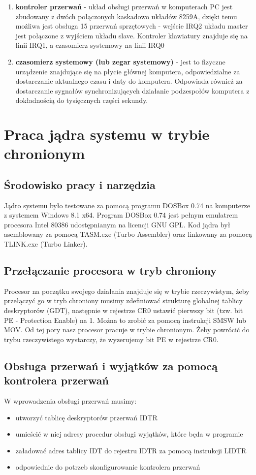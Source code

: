\documentclass[a4paper,12pt]{article}
\begin{document}
\begin{enumerate}
\item{\textbf{kontroler przerwań} - układ obsługi przerwań w komputerach PC jest zbudowany z dwóch połączonych kaskadowo układów 8259A, dzięki temu możliwa jest obsługa 15 przerwań sprzętowych - wejście IRQ2 układu master jest połączone z wyjściem układu slave. Kontroler klawiatury znajduje się na linii IRQ1, a czasomierz systemowy na linii IRQ0}
				\item{\textbf{czasomierz systemowy (lub zegar systemowy)} - jest to fizyczne urządzenie znajdujące się na płycie głównej komputera, odpowiedzialne za dostarczanie aktualnego czasu i daty do komputera. Odpowiada również za dostarczanie sygnałów synchronizujących działanie podzespołów komputera z dokładnością do tysięcznych części sekundy.}
			
\end{enumerate}

	\section{Praca jądra systemu w trybie chronionym}

	\subsection{Środowisko pracy i narzędzia}
	Jądro systemu było testowane za pomocą programu DOSBox 0.74 na komputerze z systemem Windows 8.1 x64. Program DOSBox 0.74 jest pełnym emulatrem procesora Intel 80386 udostępnianym na licencji GNU GPL. Kod jądra był asemblowany za pomocą TASM.exe (Turbo Assembler) oraz linkowany za pomocą TLINK.exe (Turbo Linker). 

	\subsection{Przełączanie procesora w tryb chroniony}
Procesor na początku swojego działania znajduje się w trybie rzeczywistym, żeby przełączyć go w tryb chroniony musimy zdefiniować strukturę globalnej tablicy deskryptorów (GDT), następnie w rejestrze CR0 ustawić pierwszy bit (tzw. bit PE - Protection Enable) na 1. Można to zrobić za pomocą instrukcji SMSW lub MOV. Od tej pory nasz procesor pracuje w trybie chronionym. Żeby powrócić do trybu rzeczywistego wystarczy, że wyzerujemy bit PE w rejestrze CR0.

\subsection{Obsługa przerwań i wyjątków za pomocą kontrolera przerwań}
W wprowadzenia obsługi przerwań musimy:
\begin{itemize}
\item{utworzyć tablicę deskryptorów przerwań IDTR}
\item{umieścić w niej adresy procedur obsługi wyjątków, które będa w programie}
\item{załadować adres tablicy IDT do rejestru IDTR za pomocą instrukcji LIDTR}
\item{odpowiednie do potrzeb skonfigurowanie kontrolera przerwań}
\end{itemize}
\end{document}
